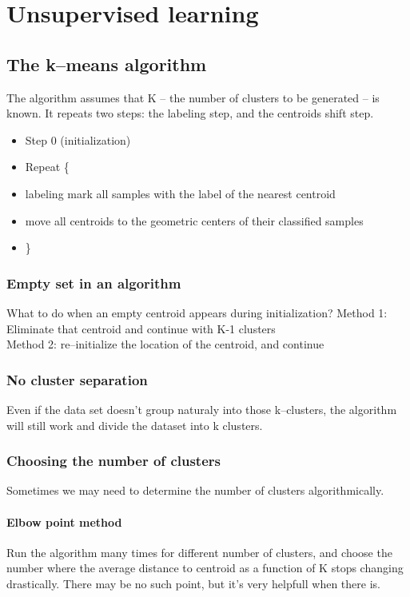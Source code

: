 \chapter{Unsupervised learning}
\section{The k--means algorithm}
The algorithm assumes that K -- the number of clusters to be generated -- is known. It repeats two steps: the labeling step, and the centroids shift step.

{
    \begin{itemize}
            \item Step 0 (initialization)
            \item Repeat \{
                \item labeling mark all samples with the label of the nearest centroid
                \item move all centroids to the geometric centers of their classified samples
            \item \}
            
    \end{itemize}
}
\subsection{Empty set in an algorithm}
What to do when an empty centroid appears during initialization?
Method 1: Eliminate that centroid and continue with K-1 clusters\\
Method 2: re--initialize the location of the centroid, and continue
\subsection{No cluster separation}
Even if the data set doesn't group naturaly into  those k--clusters, the algorithm
will still work and divide the dataset into k clusters.
\subsection{Choosing the number of clusters}
Sometimes we may need to determine the number of clusters algorithmically.
\subsubsection{Elbow point method}
Run the algorithm many times for different number of clusters, and choose the number where
the average distance to centroid as a function of K stops changing drastically.
\nt
{
    There may be no such point, but it's very helpfull when there is.
}

